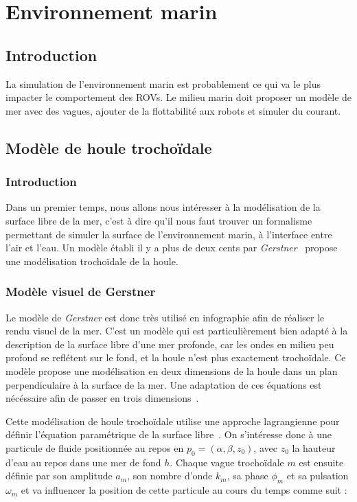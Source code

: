	\section{Environnement marin}

		\subsection{Introduction}
			
			La simulation de l'environnement marin est probablement ce qui va le plus impacter le comportement des \gls{ROV}s. Le milieu marin doit proposer un modèle de mer avec des vagues, ajouter de la flottabilité aux robots et simuler du courant.

		\subsection{Modèle de houle trochoïdale}

			\subsubsection{Introduction}

				Dans un premier temps, nous allons nous intéresser à la modélisation de la surface libre de la mer, c'est à dire qu'il nous faut trouver un formalisme permettant de simuler la surface de l'environnement marin, à l'interface entre l'air et l'eau. Un modèle établi il y a plus de deux cents par \textit{Gerstner}~\cite{Gerstner} propose une modélisation trochoïdale de la houle.

			\subsubsection{Modèle visuel de Gerstner}

				Le modèle de \textit{Gerstner} est donc très utilisé en infographie afin de réaliser le rendu visuel de la mer. C'est un modèle qui est particulièrement bien adapté à la description de la surface libre d'une mer profonde, car les ondes en milieu peu profond se reflétent sur le fond, et la houle n'est plus exactement trochoïdale. Ce modèle propose une modélisation en deux dimensions de la houle dans un plan perpendiculaire à la surface de la mer. Une adaptation de ces équations est nécéssaire afin de passer en trois dimensions~\cite{Gerstner-Like_Henry}.

				Cette modélisation de houle trochoïdale utilise une approche lagrangienne pour définir l'équation paramétrique de la surface libre~\cite{Gerstner, Gerstner-Like_Henry}. On s'intéresse donc à une particule de fluide positionnée au repos en $p_0=(\alpha, \beta, z_0)$, avec $z_0$ la hauteur d'eau au repos dans une mer de fond $h$. Chaque vague trochoïdale $m$ est ensuite définie par son amplitude $a_m$, son nombre d'onde $k_m$, sa phase $\phi_m$ et sa pulsation $\omega_m$ et va influencer la position de cette particule au cours du temps comme suit :

